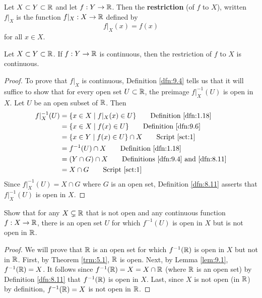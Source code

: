 \documentclass[../main.tex]{subfiles}
\begin{document}
\begin{definition}\label{dfn:9.6}
    Let $X\subset Y\subset\mathbb{R}$ and let $f:Y\to\mathbb{R}$. Then the \textbf{restriction} (of $f$ to $X$), written $f|_X$ is the function $f|_X:X\to\mathbb{R}$ defined by
    \begin{equation*}
        f|_X(x) = f(x)
    \end{equation*}
    for all $x\in X$.
\end{definition}

\begin{proposition}\label{prp:9.7}
    Let $X\subset Y\subset\mathbb{R}$. If $f:Y\to\mathbb{R}$ is continuous, then the restriction of $f$ to $X$ is continuous.
    \begin{proof}
        To prove that $f|_X$ is continuous, Definition \ref{dfn:9.4} tells us that it will suffice to show that for every open set $U\subset\mathbb{R}$, the preimage $f|_X^{-1}(U)$ is open in $X$. Let $U$ be an open subset of $\mathbb{R}$. Then
        \begingroup
        \allowdisplaybreaks
        \begin{align*}
            f|_X^{-1}(U) &= \{x\in X\mid f|_X(x)\in U\}\tag*{Definition \ref{dfn:1.18}}\\
            &= \{x\in X\mid f(x)\in U\}\tag*{Definition \ref{dfn:9.6}}\\
            &= \{x\in Y\mid f(x)\in U\}\cap X\tag*{Script \ref{sct:1}}\\
            &= f^{-1}(U)\cap X\tag*{Definition \ref{dfn:1.18}}\\
            &= (Y\cap G)\cap X\tag*{Definitions \ref{dfn:9.4} and \ref{dfn:8.11}}\\
            &= X\cap G\tag*{Script \ref{sct:1}}
        \end{align*}
        \endgroup
        Since $f|_X^{-1}(U)=X\cap G$ where $G$ is an open set, Definition \ref{dfn:8.11} asserts that $f|_X^{-1}(U)$ is open in $X$.
    \end{proof}
\end{proposition}

\begin{exercise}\label{exr:9.8}
    Show that for any $X\subsetneq\mathbb{R}$ that is not open and any continuous function $f:X\to\mathbb{R}$, there is an open set $U$ for which $f^{-1}(U)$ is open in $X$ but is not open in $\mathbb{R}$.
    \begin{proof}
        We will prove that $\mathbb{R}$ is an open set for which $f^{-1}(\mathbb{R})$ is open in $X$ but not in $\mathbb{R}$. First, by Theorem \ref{trm:5.1}, $\mathbb{R}$ is open. Next, by Lemma \ref{lem:9.1}, $f^{-1}(\mathbb{R})=X$. It follows since $f^{-1}(\mathbb{R})=X=X\cap\mathbb{R}$ (where $\mathbb{R}$ is an open set) by Definition \ref{dfn:8.11} that $f^{-1}(\mathbb{R})$ is open in $X$. Last, since $X$ is not open (in $\mathbb{R}$) by definition, $f^{-1}(\mathbb{R})=X$ is not open in $\mathbb{R}$.
    \end{proof}
\end{exercise}
\end{document}
